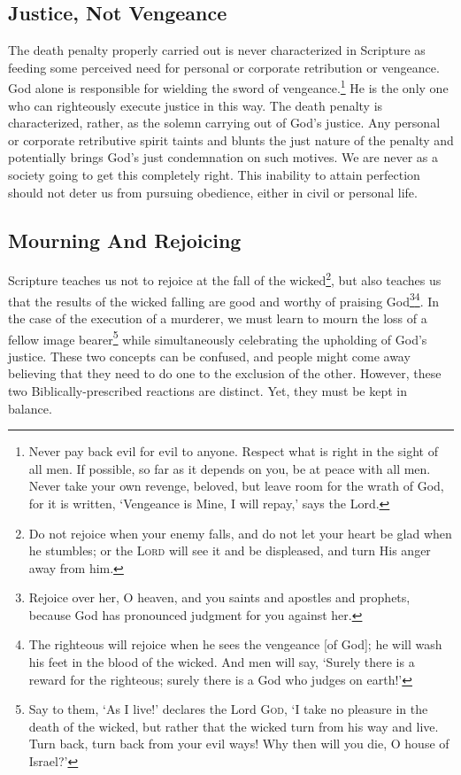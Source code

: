 \subsection{Justice, Not Vengeance}
The death penalty properly carried out is never characterized in Scripture as feeding some perceived need for personal or corporate retribution or vengeance.  God alone is responsible for wielding the sword of vengeance.\footnote{Never pay back evil for evil to anyone.  Respect what is right in the sight of all men.  If possible, so far as it depends on you, be at peace with all men.  Never take your own revenge, beloved, but leave room for the wrath of God, for it is written, `Vengeance is Mine, I will repay,' says the Lord.}  He is the only one who can righteously execute justice in this way.  The death penalty is characterized, rather, as the solemn carrying out of God's justice.  Any personal or corporate retributive spirit taints and blunts the just nature of the penalty and potentially brings God's just condemnation on such motives.  We are never as a society going to get this completely right. This inability to attain perfection should not deter us from pursuing obedience, either in civil or personal life.  

\subsection{Mourning And Rejoicing}
Scripture teaches us not to rejoice at the fall of the wicked\footnote{Do not rejoice when your enemy falls, and do not let your heart be glad when he stumbles; or the \textsc{Lord} will see it and be displeased, and turn His anger away from him.}, but also teaches us that the results of the wicked falling are good and worthy of praising God\footnote{Rejoice over her, O heaven, and you saints and apostles and prophets, because God has pronounced judgment for you against her.}\footnote{The righteous will rejoice when he sees the vengeance [of God]; he will wash his feet in the blood of the wicked.  And men will say, `Surely there is a reward for the righteous; surely there is a God who judges on earth!'}.   In the case of the execution of a murderer, we must learn to mourn the loss of a fellow image bearer\footnote{Say to them, `As I live!' declares the Lord \textsc{God}, `I take no pleasure in the death of the wicked, but rather that the wicked turn from his way and live.  Turn back, turn back from your evil ways!  Why then will you die, O house of Israel?'} while simultaneously celebrating the upholding of God's justice. These two concepts can be confused, and people might come away believing that they need to do one to the exclusion of the other. However, these two Biblically-prescribed reactions are distinct.  Yet, they must be kept in balance.

